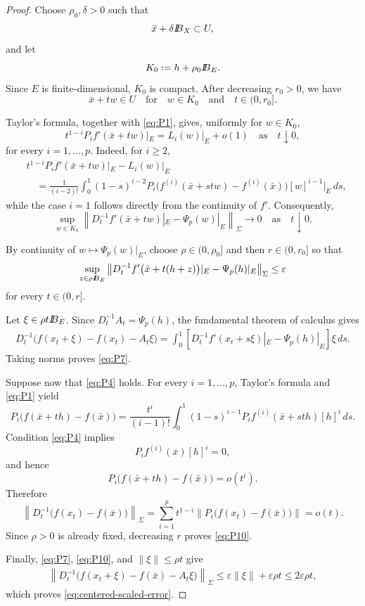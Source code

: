 \documentclass[10pt,a4paper]{amsart}
\def\ball{{I\kern -.35em B}}
\newcommand{\bx}{\bar x}
\begin{document}
	\begin{proof}
		Choose $\rho_0,\delta>0$ such that
		$$
		\bx+\delta\ball_X\subset U,
		$$
		and let
		$$
		K_0:=h+\rho_0\ball_E.
		$$
		Since $E$ is finite-dimensional, $K_0$ is compact. After decreasing
		$r_0>0$, we have
		$$
		\bx+tw\in U
		\quad\text{for}\quad
		w\in K_0 \quad\text{and}\quad t\in(0, r_0].
		$$
		
		Taylor's formula, together with \eqref{eq:P1}, gives, uniformly for
		$w\in K_0$,
		$$
		t^{1-i}P_i f'(\bx+tw)|_E
		=
		L_i(w)|_E+o(1)
		\quad\text{as}\quad t\downarrow0,
		$$
		for every $i=1,\ldots,p$. Indeed, for $i\ge2$,
		$$
		\begin{aligned}
			&t^{1-i}P_i f'(\bx+tw)|_E-L_i(w)|_E\\
			&\quad=
			\frac{1}{(i-2)!}
			\int_0^1(1-s)^{i-2}
			P_i\bigl(f^{(i)}(\bx+stw)-f^{(i)}(\bx)\bigr)
			[w]^{i-1}|_E\,ds,
		\end{aligned}
		$$
		while the case $i=1$ follows directly from the continuity of $f'$.
		Consequently,
		$$
		\sup_{w\in K_0}
		\left\|
		D_t^{-1}f'(\bx+tw)|_E-\Psi_p(w)|_E
		\right\|_\Sigma
		\longrightarrow0
		\quad\text{as}\quad  t\downarrow0.
		$$
		
		By continuity of $w\mapsto\Psi_p(w)|_E$, choose
		$\rho\in(0,\rho_0]$ and then $r\in(0,r_0]$ so that
		$$
		\sup_{z\in\rho\ball_E}
		\left\|
		D_t^{-1}f'\bigl(\bx+t(h+z)\bigr)|_E
		-\Psi_p(h)|_E
		\right\|_\Sigma
		\le\varepsilon
		$$
		for every $t\in(0,r]$.
		
		Let $\xi\in\rho t\ball_E$. Since
		$D_t^{-1}A_t=\Psi_p(h)$, the fundamental theorem of calculus gives
		$$
		\begin{aligned}
			D_t^{-1}
			\bigl(f(x_t+\xi)-f(x_t)-A_t\xi\bigr)
			=
			\int_0^1
			\left[
			D_t^{-1}f'(x_t+s\xi)|_E-\Psi_p(h)|_E
			\right]\xi\,ds.
		\end{aligned}
		$$
		Taking norms proves \eqref{eq:P7}.
		
		Suppose now that \eqref{eq:P4} holds. For every
		$i=1,\ldots,p$, Taylor's formula and \eqref{eq:P1} yield
		$$
		P_i\bigl(f(\bx+th)-f(\bx)\bigr)
		=
		\frac{t^i}{(i-1)!}
		\int_0^1(1-s)^{i-1}
		P_i f^{(i)}(\bx+sth)[h]^i\,ds.
		$$
		Condition \eqref{eq:P4} implies
		$$
		P_i f^{(i)}(\bx)[h]^i=0,
		$$
		and hence
		$$
		P_i\bigl(f(\bx+th)-f(\bx)\bigr)=o(t^i).
		$$
		Therefore
		\begin{equation}
			\label{eq:p-factor-center-small-o}
			\left\|D_t^{-1}
			\bigl(f(x_t)-f(\bx)\bigr)
			\right\|_\Sigma
			=
			\sum_{i=1}^p
			t^{1-i}
			\left\|P_i\bigl(f(x_t)-f(\bx)\bigr)\right\|
			=o(t).
		\end{equation}
		Since $\rho>0$ is already fixed, decreasing $r$ proves
		\eqref{eq:P10}.
		
		Finally, \eqref{eq:P7}, \eqref{eq:P10}, and
		$\|\xi\|\le\rho t$ give
		$$
		\begin{aligned}
			\left\|D_t^{-1}
			\bigl(f(x_t+\xi)-f(\bx)-A_t\xi\bigr)
			\right\|_\Sigma\le
			\varepsilon\|\xi\|+\varepsilon\rho t
			\le2\varepsilon\rho t,
		\end{aligned}
		$$
		which proves \eqref{eq:centered-scaled-error}.
	\end{proof}
\end{document}
